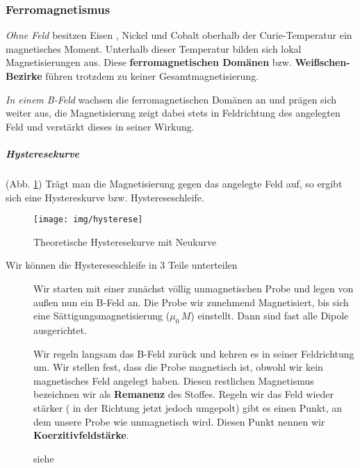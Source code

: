 \subsubsection{Ferromagnetismus}
\textit{Ohne Feld} besitzen Eisen , Nickel und Cobalt oberhalb der Curie-Temperatur ein magnetisches Moment. Unterhalb dieser Temperatur bilden sich lokal Magnetisierungen aus. Diese \textbf{ferromagnetischen Domänen} bzw. \textbf{Weißschen-Bezirke} führen trotzdem zu keiner Gesamtmagnetisierung.

\textit{In einem B-Feld} wachsen die ferromagnetischen Domänen an und prägen sich weiter aus, die Magnetisierung zeigt dabei stets in Feldrichtung des angelegten Feld und verstärkt dieses in seiner Wirkung.
\subparagraph{Hysteresekurve}(Abb. \ref{pic:Hysterese})
Trägt man die Magnetisierung gegen das angelegte Feld auf,  so ergibt sich eine Hystereskurve bzw. Hystereseschleife.
\begin{figure}\begin{center}
\texttt{[image: img/hysterese]}\end{center}
\caption{Theoretische Hysteresekurve mit Neukurve }
\label{pic:Hysterese}
\end{figure}

Wir können die Hystereseschleife in 3 Teile unterteilen
\begin{description}
\item[] Wir starten mit einer zunächst völlig unmagnetischen Probe und legen von außen nun ein B-Feld an. Die Probe wir zunehmend Magnetisiert, bis sich eine Sättigungsmagnetisierung ($\mu_0  \, M$) einstellt. Dann sind fast alle Dipole ausgerichtet.

\item[] Wir regeln langsam das B-Feld zurück und kehren es in seiner Feldrichtung um. Wir stellen fest, dass die Probe magnetisch ist, obwohl wir kein magnetisches Feld angelegt haben. Diesen restlichen Magnetismus  bezeichnen wir als \textbf{Remanenz} des Stoffes. Regeln wir das Feld wieder stärker ( in der Richtung jetzt jedoch umgepolt) gibt es einen Punkt, an dem unsere Probe wie unmagnetisch wird. Diesen Punkt nennen wir  \textbf{Koerzitivfeldstärke}.
\item[] siehe 
\end{description}




